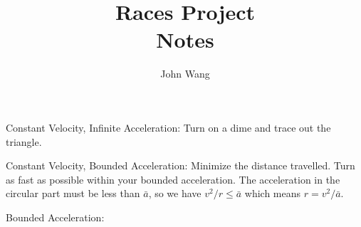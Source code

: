 \documentclass[psamsfonts]{amsart}
\title{Races Project \\
Notes}
\author{John Wang}
\begin{document}
\maketitle

\item Constant Velocity, Infinite Acceleration: Turn on a dime and trace out the triangle.
\item Constant Velocity, Bounded Acceleration: Minimize the distance travelled. Turn as fast as possible within your bounded acceleration. The acceleration in the circular part must be less than $\bar{a}$, so we have $v^2/r \leq \bar{a}$ which means $r = v^2 / \bar{a}$.
\item Bounded Acceleration:
\end{document}
